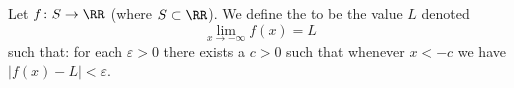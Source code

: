 \begin{node}
\begin{definition}\label{calculus:differential:limits-0005}%
Let $f\colon S\to\RR$ (where $S\subset\RR$). We define the  to be the value $L$ denoted
\begin{equation*}
\lim_{x\to-\infty}f(x)=L
\end{equation*}
such that: for each $\varepsilon>0$ there exists a $c>0$ such that
whenever $x<-c$ we have $|f(x)-L|<\varepsilon$.
\end{definition}
\end{node}
